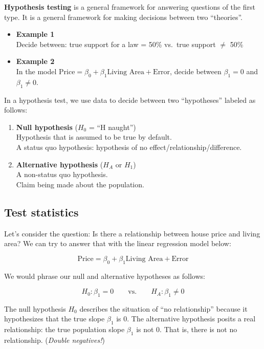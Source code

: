 \documentclass[
]{book}
\begin{document}
\textbf{Hypothesis testing} is a general framework for answering questions of the first type. It is a general framework for making decisions between two ``theories''.

\begin{itemize}
\item
  \textbf{Example 1}\\
  Decide between: true support for a law = 50\% vs.~true support \(\neq\) 50\%
\item
  \textbf{Example 2}\\
  In the model \(\text{Price} = \beta_0 + \beta_1\text{Living Area} + \text{Error}\), decide between \(\beta_1 = 0\) and \(\beta_1 \neq 0\).
\end{itemize}

In a hypothesis test, we use data to decide between two ``hypotheses'' labeled as follows:

\begin{enumerate}
\def\labelenumi{\arabic{enumi}.}
\item
  \textbf{Null hypothesis} (\(H_0\) = ``H naught'')\\
  Hypothesis that is assumed to be true by default.\\
  A status quo hypothesis: hypothesis of no effect/relationship/difference.
\item
  \textbf{Alternative hypothesis} (\(H_A\) or \(H_1\))\\
  A non-status quo hypothesis.\\
  Claim being made about the population.
\end{enumerate}

\hypertarget{test-statistics}{%
\subsection{Test statistics}\label{test-statistics}}

Let's consider the question: Is there a relationship between house price and living area? We can try to answer that with the linear regression model below:

\[\text{Price} = \beta_0 + \beta_1\text{Living Area} + \text{Error}\]

We would phrase our null and alternative hypotheses as follows:

\[H_0: \beta_1 = 0 \qquad \text{vs.} \qquad H_A: \beta_1 \neq 0\]

The null hypothesis \(H_0\) describes the situation of ``no relationship'' because it hypothesizes that the true slope \(\beta_1\) is 0. The alternative hypothesis posits a real relationship: the true population slope \(\beta_1\) is not 0. That is, there is not no relationship. (\emph{Double negatives!})
\end{document}
